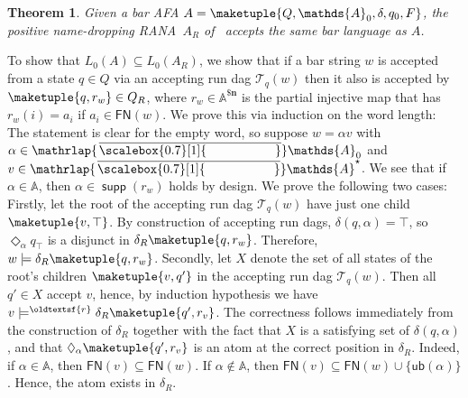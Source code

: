 \documentclass[10pt,a4paper]{amsart}
\newtheorem{theo}{Theorem}[section]
\theoremstyle{definition}
\renewcommand{\textsf}[1]{{\oldtextsf{\small#1}}}
\newcommand{\seq}{\subseteq}
\newcommand{\At}{\mathds{A}}
\newcommand{\barAs}{\barNames^{\star}}
\newcommand{\runtree}[3]{\mathcal{T}_{#1}^{#2}(#3)}
\newcommand{\rsem}{\vDash^{\textsf{r}}}
\DeclareMathOperator{\supp}{\mathsf{supp}}
\newcommand{\names}{\At}
\newcommand{\parnom}[1]{\names^{\$\mathbf{#1}}}
\newcommand{\set}[1]{\{#1\}}
\newcommand{\mybar}[3]{%
  \mathrlap{\hspace{#2}\overline{\scalebox{#1}[1]{\phantom{\ensuremath{#3}}}}}\ensuremath{#3}
}
\newcommand{\FN}{\mathsf{FN}}
\newcommand{\barNames}{{\mybar{0.7}{1.25pt}{\names}}}
\newcommand{\ub}{{\mathsf{ub}}}
\renewcommand{\vDash}{\models}
\begin{document}
\begin{theo}\label{thm:corrConstrB2R}
  Given a bar AFA $A = \maketuple{Q, \names_0, \delta, q_0, F}$, the positive name-dropping RANA~$A_{R}$ of~ accepts the same bar language as $A$.
\end{theo}
\begin{IEEEproof}
  To show that $L_0(A) \seq L_0(A_R)$, we show that if a bar string $w$ is accepted from a state
  $q \in Q$ via an accepting run dag $\runtree{q}{}{w}$ then it also is accepted by $\maketuple{q, r_w}
  \in Q_R$, where $r_w \in \parnom{n}$ is the partial injective map that has $r_w(i) = a_i$ if
  $a_i \in \FN(w)$. We prove this via induction on the word length:
  The statement is clear for the empty word, so suppose $w = \alpha v$ with $\alpha \in \barNames_0$
  and $v \in \barAs$. We see that if $\alpha \in \names$, then $\alpha \in \supp(r_w)$ holds by design.
  We prove the following two cases: Firstly, let the root of the accepting run dag
  $\runtree{q}{}{w}$ have just one child $\maketuple{v, \top}$. By construction of accepting run dags,
  $\delta(q, \alpha) = \top$, so $\Diamond_{\alpha} q_{\top}$ is a disjunct in $\delta_R\maketuple{q, r_w}$.
  Therefore, $w \vDash \delta_R\maketuple{q, r_w}$.
  Secondly, let $X$ denote the set of all states of the root's children $\maketuple{v, q'}$
  in the accepting run dag $\runtree{q}{}{w}$. Then all $q' \in X$ accept $v$, hence, by induction hypothesis
  we have $v \rsem \delta_R\maketuple{q',r_v}$. The correctness follows immediately from the
  construction of $\delta_R$ together with the fact that $X$ is a satisfying set of $\delta(q, \alpha)$,
  and that $\Diamond_\alpha\maketuple{q', r_v}$ is an atom at the correct position in $\delta_R$.
  Indeed, if $\alpha \in \names$, then $\FN(v) \seq \FN(w)$. If $\alpha \notin \names$, then $\FN(v)
  \seq \FN(w) \cup \set{\ub(\alpha)}$. Hence, the atom exists in $\delta_R$.


\end{IEEEproof}
\end{document}
